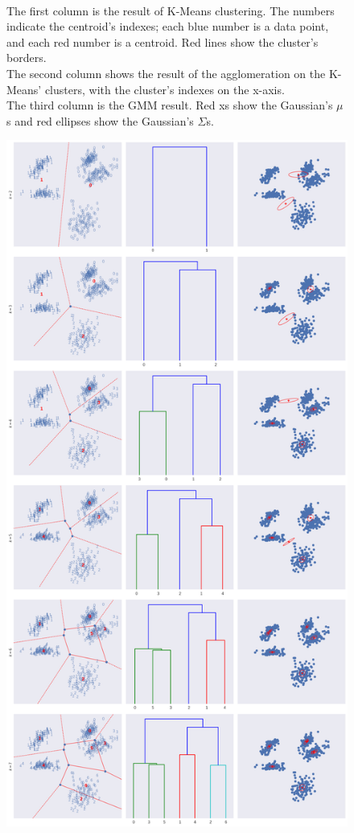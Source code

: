 \documentclass[a4paper,11pt]{article}
\begin{document}
\begin{figure}
{{            \\The first column is the result of K-Means clustering. The numbers indicate the centroid's indexes; each blue number is a data point, and each red number is a centroid. Red lines show the cluster's borders.
            \\The second column shows the result of the agglomeration on the K-Means' clusters, with the cluster's indexes on the x-axis.
            \\The third column is the GMM result. Red xs show the Gaussian's $\mu$s and red ellipses show the Gaussian's $\Sigma$s.}}
    \label{fig:assignment7_2}
\end{figure}

\begin{figure}
    \centering
    \includegraphics[scale=0.23]{../images/assignment7_no_kmeans_init.png}

\end{figure}
\end{document}
